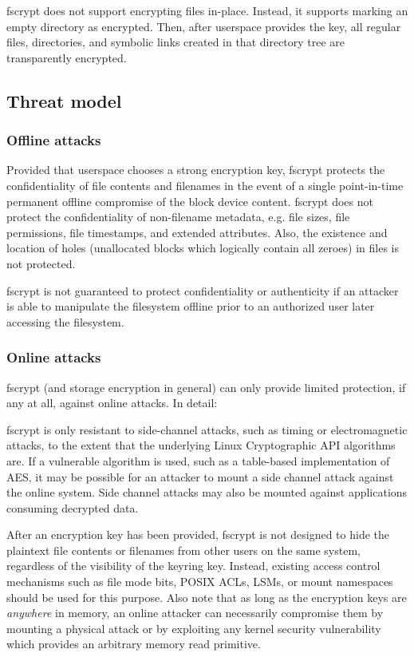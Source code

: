 \documentclass[a4paper,8pt,english]{sphinxmanual}
\begin{document}
fscrypt does not support encrypting files in-place.  Instead, it
supports marking an empty directory as encrypted.  Then, after
userspace provides the key, all regular files, directories, and
symbolic links created in that directory tree are transparently
encrypted.


\subsection{Threat model}
\label{filesystems/fscrypt:threat-model}

\subsubsection{Offline attacks}
\label{filesystems/fscrypt:offline-attacks}
Provided that userspace chooses a strong encryption key, fscrypt
protects the confidentiality of file contents and filenames in the
event of a single point-in-time permanent offline compromise of the
block device content.  fscrypt does not protect the confidentiality of
non-filename metadata, e.g. file sizes, file permissions, file
timestamps, and extended attributes.  Also, the existence and location
of holes (unallocated blocks which logically contain all zeroes) in
files is not protected.

fscrypt is not guaranteed to protect confidentiality or authenticity
if an attacker is able to manipulate the filesystem offline prior to
an authorized user later accessing the filesystem.


\subsubsection{Online attacks}
\label{filesystems/fscrypt:online-attacks}
fscrypt (and storage encryption in general) can only provide limited
protection, if any at all, against online attacks.  In detail:

fscrypt is only resistant to side-channel attacks, such as timing or
electromagnetic attacks, to the extent that the underlying Linux
Cryptographic API algorithms are.  If a vulnerable algorithm is used,
such as a table-based implementation of AES, it may be possible for an
attacker to mount a side channel attack against the online system.
Side channel attacks may also be mounted against applications
consuming decrypted data.

After an encryption key has been provided, fscrypt is not designed to
hide the plaintext file contents or filenames from other users on the
same system, regardless of the visibility of the keyring key.
Instead, existing access control mechanisms such as file mode bits,
POSIX ACLs, LSMs, or mount namespaces should be used for this purpose.
Also note that as long as the encryption keys are \emph{anywhere} in
memory, an online attacker can necessarily compromise them by mounting
a physical attack or by exploiting any kernel security vulnerability
which provides an arbitrary memory read primitive.
\end{document}
